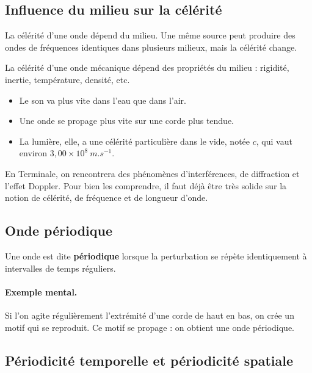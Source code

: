 \documentclass[11pt,a4paper]{article}
\begin{document}
\subsection{Influence du milieu sur la célérité}
La célérité d'une onde dépend du milieu. Une même source peut produire des ondes de fréquences identiques dans plusieurs milieux, mais la célérité change.

\begin{propriete}
La célérité d'une onde mécanique dépend des propriétés du milieu : rigidité, inertie, température, densité, etc.
\end{propriete}

\begin{exemplebox}
\begin{itemize}
    \item Le son va plus vite dans l'eau que dans l'air.
    \item Une onde se propage plus vite sur une corde plus tendue.
    \item La lumière, elle, a une célérité particulière dans le vide, notée $c$, qui vaut environ $3,00\times 10^8\ \si{m.s^{-1}}$.
\end{itemize}
\end{exemplebox}

\begin{ouverture}
En Terminale, on rencontrera des phénomènes d'interférences, de diffraction et l'effet Doppler. Pour bien les comprendre, il faut déjà être très solide sur la notion de célérité, de fréquence et de longueur d'onde.
\end{ouverture}

\subsection{Onde périodique}

\begin{definitionbox}
Une onde est dite \textbf{périodique} lorsque la perturbation se répète identiquement à intervalles de temps réguliers.
\end{definitionbox}

\paragraph{Exemple mental.}
Si l'on agite régulièrement l'extrémité d'une corde de haut en bas, on crée un motif qui se reproduit. Ce motif se propage : on obtient une onde périodique.

\subsection{Périodicité temporelle et périodicité spatiale}
\end{document}

